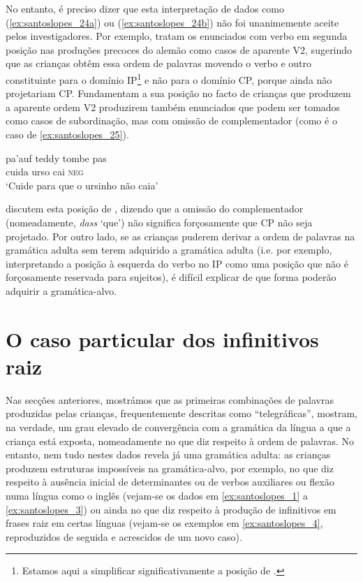 \documentclass[output=paper]{LSP/langsci}
\begin{document}
No entanto, é preciso dizer que esta interpretação de dados como (\ref{ex:santoslopes_24a}) ou (\ref{ex:santoslopes_24b}) não foi unanimemente aceite pelos investigadores. Por exemplo, \citet{meiselmuller1992} tratam os enunciados com verbo em segunda posição nas produções precoces do alemão como casos de aparente V2, sugerindo que as crianças obtêm essa ordem de palavras movendo o verbo e outro constituinte para o domínio IP\footnote{Estamos aqui a simplificar significativamente a posição de \citet{meiselmuller1992}.} e não para o domínio CP, porque ainda não projetariam CP. Fundamentam a sua posição no facto de crianças que produzem a aparente ordem V2 produzirem também enunciados que podem ser tomados como casos de subordinação, mas com omissão de complementador (como é o caso de \ref{ex:santoslopes_25}).

\ea\label{ex:santoslopes_25}
\gll pa'auf teddy tombe pas\\
cuida urso cai \textsc{neg}\\
\glt `Cuide para que o ursinho não caia'
\z

\citet{poeppelwexler1993} discutem esta posição de \citeauthor{meiselmuller1992}, dizendo que a omissão do complementador (nomeadamente, \textit{dass} ‘que’) não significa forçosamente que CP não seja projetado. Por outro lado, se as crianças puderem derivar a ordem de palavras na gramática adulta sem terem adquirido a gramática adulta (i.e. por exemplo, interpretando a posição à esquerda do verbo no IP como uma posição que não é forçosamente reservada para sujeitos), é difícil explicar de que forma poderão adquirir a gramática-alvo. 


\section{O caso particular dos infinitivos raiz}
\label{sec:infinitivos_raiz}
Nas secções anteriores, mostrámos que as primeiras combinações de palavras produzidas pelas crianças, frequentemente descritas como “telegráficas”, mostram, na verdade, um grau elevado de convergência com a gramática da língua a que a criança está exposta, nomeadamente no que diz respeito à ordem de palavras. No entanto, nem tudo nestes dados revela já uma gramática adulta: as crianças produzem estruturas impossíveis na gramática-alvo, por exemplo, no que diz respeito à ausência inicial de determinantes ou de verbos auxiliares ou flexão numa língua como o inglês (vejam-se os dados em \ref{ex:santoslopes_1} a \ref{ex:santoslopes_3}) ou ainda no que diz respeito à produção de infinitivos em frases raiz em certas línguas (vejam-se os exemplos em \ref{ex:santoslopes_4}, reproduzidos de seguida e acrescidos de um novo caso).
\end{document}
